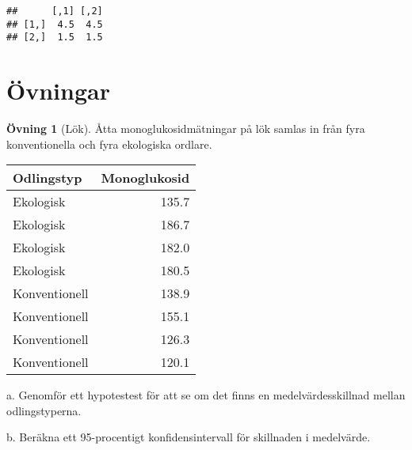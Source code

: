 \documentclass[
]{book}
\theoremstyle{definition}
\theoremstyle{definition}
\theoremstyle{definition}
\newtheorem{exercise}{Övning}[chapter]
\theoremstyle{definition}
\theoremstyle{remark}
\begin{document}
\begin{verbatim}
##      [,1] [,2]
## [1,]  4.5  4.5
## [2,]  1.5  1.5
\end{verbatim}

\hypertarget{uxf6vningar-3}{%
\section{Övningar}\label{uxf6vningar-3}}

\begin{exercise}[Lök]
Åtta monoglukosidmätningar på lök samlas in från fyra konventionella och fyra ekologiska ordlare.

\begin{table}
\centering
\begin{tabular}[t]{lr}
\toprule
Odlingstyp & Monoglukosid\\
\midrule
Ekologisk & 135.7\\
Ekologisk & 186.7\\
Ekologisk & 182.0\\
Ekologisk & 180.5\\
Konventionell & 138.9\\
\addlinespace
Konventionell & 155.1\\
Konventionell & 126.3\\
Konventionell & 120.1\\
\bottomrule
\end{tabular}
\end{table}

a. Genomför ett hypotestest för att se om det finns en medelvärdesskillnad mellan odlingstyperna.

b. Beräkna ett 95-procentigt konfidensintervall för skillnaden i medelvärde.
\end{exercise}
\end{document}
